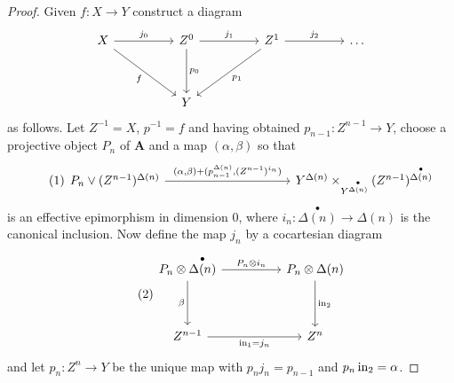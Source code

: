 \documentclass[../main]{subfiles}
\begin{document}
\begin{proof}
Given $f \colon X \longrightarrow Y$ construct a diagram
\[
\begin{tikzcd}
    X
    \arrow[rr, "j_0"]
    \arrow[ddrr, "f"']
    &&
    Z^0 
    \arrow[rr, "j_1"]
    \arrow[dd, "p_0"]
    &&
    Z^1
    \arrow[rr, "j_2"]
    \arrow[ddll, "p_1"]
    &&
    \dots
    \\\\&&
    Y
\end{tikzcd}
\]
as follows. Let $Z^{-1} = X$, $p^{-1} = f$ and having obtained $p_{n-1} \colon Z^{n-1} \longrightarrow Y$, choose a projective object $P_n$ of $\mathbf{A}$ and a map $(\alpha, \beta)$ so that 
\begin{equation}\tag{1}
\label{eq:2.4.1}
\begin{tikzcd}[column sep = 1.4in]
    P_n \vee (Z^{n-1})^{\Delta(n)} 
    \arrow[r, "{(\alpha, \beta)+ (p_{n-1}^{\Delta(n)}, (Z^{n-1})^{i_n})}"] 
    &
    Y^{\Delta(n)} \times_{Y^{\overset{\bullet}{\Delta(n)}}} (Z^{n-1})^{\overset{\bullet}{\Delta(n)}}
\end{tikzcd}
\end{equation}
is an effective epimorphism in dimension $0$, where $i_n \colon \overset{\bullet}{\Delta(n)} \longrightarrow \Delta(n)$ is the canonical inclusion. Now define the map $j_n$ by a cocartesian diagram
\begin{equation}\tag{2}
\label{eq:2.4.2}
\begin{tikzcd}
    P_n \otimes \overset{\bullet}{\Delta(n)} 
    \arrow[rr, "P_n \otimes i_n"]
    \arrow[dd, "\beta"']
    &&
    P_n \otimes \Delta(n)
    \arrow[dd, "\In_2"]
    \\\\
    Z^{n-1}
    \arrow[rr, "\In_1 = j_n"']
    &&
    Z^n
\end{tikzcd}
\end{equation}
and let $p_n \colon Z^n \longrightarrow Y$ be the unique map with $p_nj_n = p_{n-1}$ and $p_n \operatorname{in}_2 = \alpha$.


\end{proof}
\end{document}
